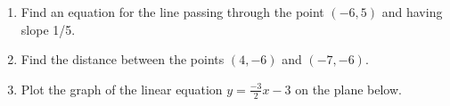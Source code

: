 \documentclass{article}
\begin{document}
\HomeworkTitle[class={College Algebra}, number={3}, name={Lines and Circles}]

\begin{enumerate}
\item Find an equation for the line passing through the point $(-6, 5)$ and having slope 1/5. \vspace{5cm}

\item Find the distance between the points $(4, -6)$ and $(-7, -6)$. \vspace{5cm}

\item Plot the graph of the linear equation $y = \frac{-3}{2} x - 3$ on the plane below.\begin{center}
\CartesianPlane[h=7,w=7,axes=yes]
\end{center}

  
\end{enumerate}
\end{document}
